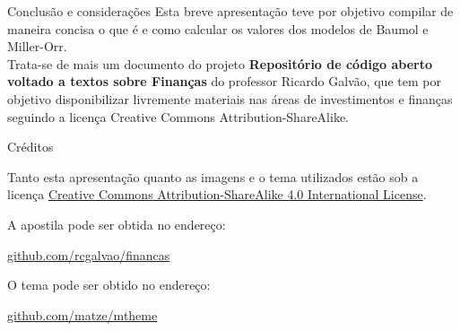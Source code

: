 \documentclass[10pt]{beamer}
\begin{document}
\begin{frame}[fragile]{Conclusão e considerações}
Esta breve apresentação teve por objetivo compilar de maneira concisa o que é e como calcular os valores dos modelos de Baumol e Miller-Orr.\\
Trata-se de mais um documento do projeto \textbf{Repositório de código aberto voltado a textos sobre Finanças} do professor Ricardo Galvão, que tem por objetivo disponibilizar livremente materiais nas áreas de investimentos e finanças seguindo a licença Creative Commons Attribution-ShareAlike.


\end{frame}


\begin{frame}{Créditos}

Tanto esta apresentação quanto as imagens e o tema utilizados estão sob a licença  \href{http://creativecommons.org/licenses/by-sa/4.0/}{Creative Commons
  Attribution-ShareAlike 4.0 International License}.
  \begin{center}\ccbysa\end{center}

A apostila pode ser obtida no endereço:
\begin{center}\url{github.com/rcgalvao/financas}\end{center}

O tema pode ser obtido no endereço: 
\begin{center}\url{github.com/matze/mtheme}\end{center}

\end{frame}
\end{document}
